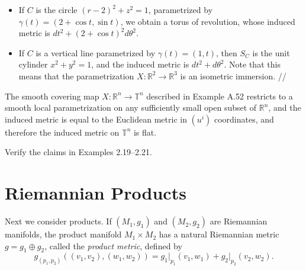 \begin{example}
\begin{itemize}
\item If $C$ is the circle $(r-2)^2 + z^2 = 1$, parametrized by $\gamma(t) = (2+\cos t, \sin t)$, we obtain a torus of revolution, whose induced metric is $dt^2 + (2+\cos t)^2 d\theta^2$.

\item If $C$ is a vertical line parametrized by $\gamma(t) = (1,t)$, then $S_C$ is the unit cylinder $x^2 + y^2 = 1$, and the induced metric is $dt^2 + d\theta^2$. Note that this means that the parametrization $X: \mathbb{R}^2 \to \mathbb{R}^3$ is an isometric immersion. \quad //
\end{itemize}
\end{example}

\begin{example}
\label{ex:n-torus-riemannian-submanifold}

The smooth covering map $X: \mathbb{R}^n \to \mathbb{T}^n$ described in Example A.52 restricts to a smooth local parametrization on any sufficiently small open subset of $\mathbb{R}^n$, and the induced metric is equal to the Euclidean metric in $(u^i)$ coordinates, and therefore the induced metric on $\mathbb{T}^n$ is flat.
\end{example}

\begin{exercise}
\label{exer:verify-surface-revolution-examples}

Verify the claims in Examples 2.19–2.21.
\end{exercise}

\section{Riemannian Products}

Next we consider products. If $(M_1, g_1)$ and $(M_2, g_2)$ are Riemannian manifolds, the product manifold $M_1 \times M_2$ has a natural Riemannian metric $g = g_1 \oplus g_2$, called the \emph{product metric}, defined by
\begin{equation}
g_{(p_1,p_2)}((v_1, v_2), (w_1, w_2)) = g_1\big|_{p_1}(v_1, w_1) + g_2\big|_{p_2}(v_2, w_2). \tag{2.12}
\end{equation}

